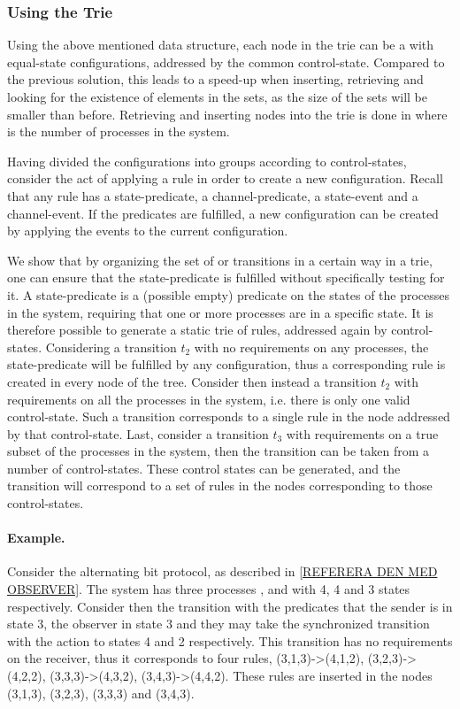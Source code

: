 \subsubsection{Using the Trie}
Using the above mentioned data structure, each node in the trie can be a  with equal-state configurations, addressed by the common control-state. Compared to the previous solution, this leads to a speed-up when inserting, retrieving and looking for the existence of elements in the sets, as the size of the sets will be smaller than before. Retrieving and inserting nodes into the trie is done in  where  is the number of processes in the system.

Having divided the configurations into groups according to control-states, consider the act of applying a rule in order to create a new configuration. Recall that any rule has a state-predicate, a channel-predicate, a state-event and a channel-event. If the predicates are fulfilled, a new configuration can be created by applying the events to the current configuration.

We show that by organizing the set of  or transitions in a certain way in a trie, one can ensure that the state-predicate is fulfilled without specifically testing for it. A state-predicate is a (possible empty) predicate on the states of the processes in the system, requiring that one or more processes are in a specific state. It is therefore possible to generate a static trie of rules, addressed again by control-states. Considering a transition $t_2$ with no requirements on any processes, the state-predicate will be fulfilled by any configuration, thus a corresponding rule is created in every node of the tree. Consider then instead a transition $t_2$ with requirements on all the processes in the system, i.e. there is only one valid control-state. Such a transition corresponds to a single rule in the node addressed by that control-state. Last, consider a transition $t_3$ with requirements on a true subset of the processes in the system, then the transition can be taken from a number of control-states. These control states can be generated, and the transition will correspond to a set of rules in the nodes corresponding to those control-states.

\paragraph{Example.} Consider the alternating bit protocol, as described in \ref{REFERERA DEN MED OBSERVER}. The system has three processes ,  and  with 4, 4 and 3 states respectively. Consider then the transition with the predicates that the sender is in state 3, the observer in state 3 and they may take the synchronized transition with the action  to states 4 and 2 respectively. This transition has no requirements on the receiver, thus it corresponds to four rules, (3,1,3)->(4,1,2), (3,2,3)->(4,2,2), (3,3,3)->(4,3,2), (3,4,3)->(4,4,2). These rules are inserted in the nodes (3,1,3), (3,2,3), (3,3,3) and (3,4,3).


